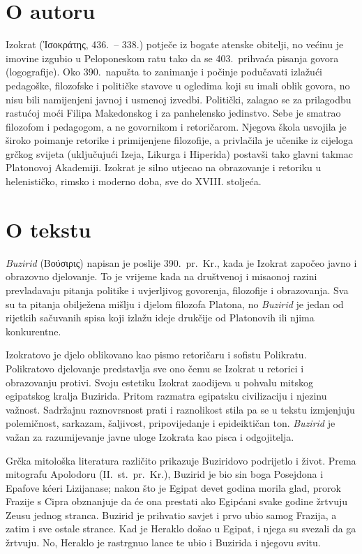 \section*{O autoru}

Izokrat (Ἰσοκράτης, 436.\ – 338.) potječe iz bogate atenske obitelji, no većinu je imovine izgubio u Peloponeskom ratu tako da se 403.\ prihvaća pisanja govora (logografije). Oko 390.\ napušta to zanimanje i počinje podučavati izlažući pedagoške, filozofske i političke stavove u ogledima koji su imali oblik govora, no nisu bili namijenjeni javnoj i usmenoj izvedbi. Politički, zalagao se za prilagodbu rastućoj moći Filipa Makedonskog i za panhelensko jedinstvo. Sebe je smatrao filozofom i pedagogom, a ne govornikom i retoričarom. Njegova škola usvojila je široko poimanje retorike i primijenjene filozofije, a privlačila je učenike iz cijeloga grčkog svijeta (uključujući Izeja, Likurga i Hiperida) postavši tako glavni takmac Platonovoj Akademiji. Izokrat je silno utjecao na obrazovanje i retoriku u helenističko, rimsko i moderno doba, sve do XVIII. stoljeća.

\section*{O tekstu}

\textit{Buzirid} (Βούσιρις) napisan je poslije 390.\ pr.~Kr., kada je Izokrat započeo javno i obrazovno djelovanje. To je vrijeme kada na društvenoj i misaonoj razini prevladavaju pitanja politike i uvjerljivog govorenja, filozofije i obrazovanja. Sva su ta pitanja obilježena mišlju i djelom filozofa Platona, no \textit{Buzirid} je jedan od rijetkih sačuvanih spisa koji izlažu ideje drukčije od Platonovih ili njima konkurentne. 

Izokratovo je djelo oblikovano kao pismo retoričaru i sofistu Polikratu. Polikratovo djelovanje predstavlja sve ono čemu se Izokrat u retorici i obrazovanju protivi. Svoju estetiku Izokrat zaodijeva u pohvalu mitskog egipatskog kralja Buzirida. Pritom razmatra egipatsku civilizaciju i njezinu važnost. Sadržajnu raznovrsnost prati i raznolikost stila pa se u tekstu izmjenjuju polemičnost, sarkazam, šaljivost, pripovijedanje i epideiktičan ton. \textit{Buzirid} je važan za razumijevanje javne uloge Izokrata kao pisca i odgojitelja.

Grčka mitološka literatura različito prikazuje Buziridovo podrijetlo i život. Prema mitografu Apolodoru (II.~st.\ pr.~Kr.), Buzirid je bio sin boga Posejdona i Epafove kćeri Lizijanase; nakon što je Egipat devet godina morila glad, prorok Frazije s Cipra obznanjuje da će ona prestati ako Egipćani svake godine žrtvuju Zeusu jednog stranca. Buzirid je prihvatio savjet i prvo ubio samog Frazija, a zatim i sve ostale strance. Kad je Heraklo došao u Egipat, i njega su svezali da ga žrtvuju. No, Heraklo je rastrgnuo lance te ubio i Buzirida i njegovu svitu. 

